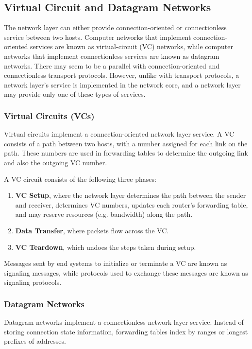 \documentclass[12pt,titlepage]{article}
\begin{document}
    \subsection{Virtual Circuit and Datagram Networks}
      The network layer can either provide connection-oriented or connectionless service between two hosts. Computer networks that implement
      connection-oriented services are known as virtual-circuit (VC) networks, while computer networks that implement connectionless services
      are known as datagram networks. There may seem to be a parallel with connection-oriented and connectionless transport protocols. However,
      unlike with transport protocols, a network layer's service is implemented in the network core, and a network layer may provide only one of
      these types of services.

      \subsubsection{Virtual Circuits (VCs)}
        Virtual circuits implement a connection-oriented network layer service. A VC consists of a path between two hosts, with a number assigned
        for each link on the path. These numbers are used in forwarding tables to determine the outgoing link and also the outgoing VC number.

        A VC circuit consists of the following three phases:
        \begin{enumerate}
          \item \textbf{VC Setup}, where the network layer determines the path between the sender and receiver, determines VC numbers, updates
            each router's forwarding table, and may reserve resources (e.g. bandwidth) along the path.
          \item \textbf{Data Transfer}, where packets flow across the VC.
          \item \textbf{VC Teardown}, which undoes the steps taken during setup.
        \end{enumerate}

        Messages sent by end systems to initialize or terminate a VC are known as signaling messages, while protocols used to exchange these messages
        are known as signaling protocols.

      \subsubsection{Datagram Networks}
        Datagram networks implement a connectionless network layer service. Instead of storing connection state information, forwarding tables
        index by ranges or longest prefixes of addresses.
\end{document}
